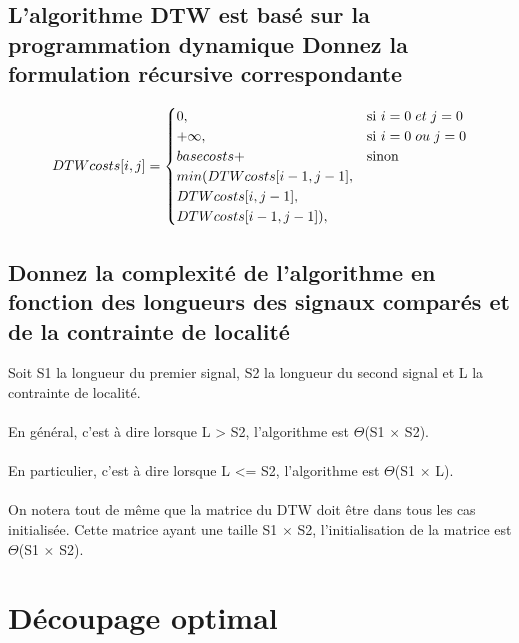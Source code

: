 \documentclass[a4paper,11pt]{article}
\begin{document}

\subsection{L'algorithme DTW est basé sur la programmation dynamique Donnez la formulation récursive correspondante}


  \begin{equation*}
    DTWcosts[i,j] =
    \begin{cases}
      0, & \text{si}\ i = 0 \hspace{0.1cm} et \hspace{0.1cm} j = 0 \\
      +\infty, & \text{si}\ i = 0 \hspace{0.1cm} ou \hspace{0.1cm} j = 0 \\
      basecosts +  & \text{sinon} \\ min(DTWcosts[i-1,j-1],\\DTWcosts[i,j-1],\\ DTWcosts[i-1,j-1]),
    \end{cases}
  \end{equation*}

\subsection{Donnez la complexité de l'algorithme en fonction des longueurs des signaux comparés et de la contrainte de localité}

Soit S1 la longueur du premier signal, S2 la longueur du second signal et L la contrainte de localité.
\\
\\
En général, c'est à dire lorsque L > S2, l'algorithme est $\Theta$(S1 $\times$ S2).
\\
\\
En particulier, c'est à dire lorsque L <= S2, l'algorithme est $\Theta$(S1 $\times$ L).
\\
\\
On notera tout de même que la matrice du DTW doit être dans tous les cas initialisée. Cette matrice ayant une taille S1 $\times$ S2, l'initialisation de la matrice est $\Theta$(S1 $\times$ S2).

\section{Découpage optimal}
\end{document}
